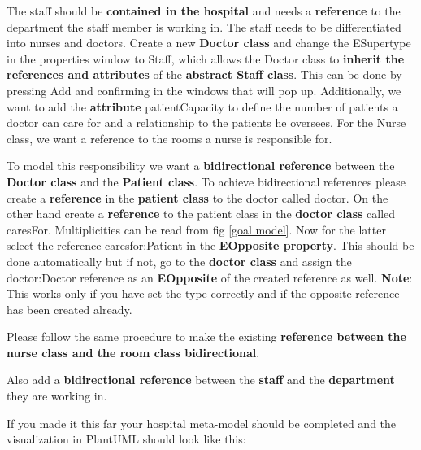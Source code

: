 The staff should be \textbf{contained in the hospital} and needs a \textbf{reference} to the department the staff member is working in.
The staff needs to be differentiated into nurses and doctors. Create a new \textbf{Doctor class} and change the \textsf{ESupertype} in the properties window to \textsf{Staff}, which allows the Doctor class to \textbf{inherit the references and attributes} of the \textbf{abstract Staff class}. This can be done by pressing \textsf{Add} and confirming in the windows that will pop up.
Additionally, we want to add the \textbf{attribute} \textsf{patientCapacity} to define the number of patients a doctor can care for and a relationship to the patients he oversees.\newline
For the Nurse class, we want a reference to the rooms a nurse is \textsf{responsible} for. 

To model this responsibility we want a \textbf{bidirectional reference} between the \textbf{Doctor class} and the \textbf{Patient class}.
To achieve bidirectional references please create a \textbf{reference} in the \textbf{patient class} to the doctor called \textsf{doctor}. On the other hand create a \textbf{reference} to the patient class in the \textbf{doctor class} called \textsf{caresFor}. Multiplicities can be read from fig \ref{goal model}.
Now for the latter select the reference \textsf{caresfor:Patient} in the \textbf{EOpposite property}. This should be done automatically but if not, go to the \textbf{doctor class} and assign the \textsf{doctor:Doctor} reference as an \textbf{EOpposite} of the created reference as well.\newline
\textbf{Note}: This works only if you have set the type correctly and if the opposite reference has been created already.\newline

Please follow the same procedure to make the existing \textbf{reference between the nurse class and the room class bidirectional}.\newline

Also add a \textbf{bidirectional reference} between the \textbf{staff} and the \textbf{department} they are \textsf{working} in.\newline

If you made it this far your hospital meta-model should be completed and the visualization in PlantUML should look like this:

